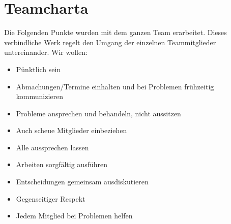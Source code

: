 
\section{Teamcharta}

  Die Folgenden Punkte wurden mit dem ganzen Team erarbeitet. Dieses verbindliche Werk regelt den Umgang der einzelnen Teammitglieder untereinander. Wir wollen:

  \begin{itemize}
    \item Pünktlich sein
    \item Abmachungen/Termine einhalten und bei Problemen frühzeitig kommunizieren
    \item Probleme ansprechen und behandeln, nicht aussitzen
    \item Auch scheue Mitglieder einbeziehen
    \item Alle aussprechen lassen
    \item Arbeiten sorgfältig ausführen
    \item Entscheidungen gemeinsam ausdiskutieren
    \item Gegenseitiger Respekt
    \item Jedem Mitglied bei Problemen helfen
  \end{itemize}
